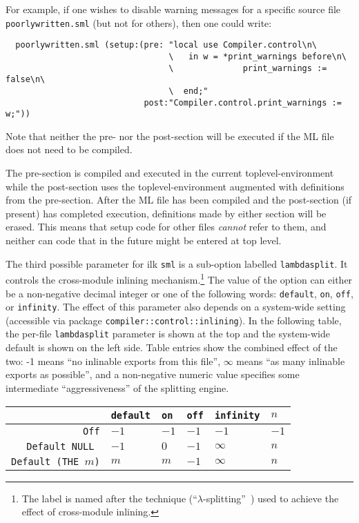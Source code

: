 For example, if one wishes to disable warning messages for a specific
source file {\tt poorlywritten.sml} (but not for others), then one
could write:

\begin{verbatim}
  poorlywritten.sml (setup:(pre: "local use Compiler.control\n\
                                 \   in w = *print_warnings before\n\
                                 \              print_warnings := false\n\
                                 \  end;"
                            post:"Compiler.control.print_warnings := w;"))
\end{verbatim}

\noindent Note that neither the pre- nor the post-section will be
executed if the ML file does not need to be compiled.

The pre-section is compiled and executed in the current
toplevel-environment while the post-section uses the
toplevel-environment augmented with definitions from the pre-section.
After the ML file has been compiled and the post-section (if present)
has completed execution, definitions made by either section will be
erased.  This means that setup code for other files {\em cannot} refer
to them, and neither can code that in the future might be entered at
top level.

The third possible parameter for ilk {\tt sml} is a
sub-option labelled {\tt lambdasplit}.  It controls the cross-module
inlining mechanism.\footnote{The label is named after the
technique (``$\lambda$-splitting''~\cite{blume97:lsplit}) used to
achieve the effect of cross-module inlining.}  The value of the option
can either be a non-negative decimal integer or one of the following
words: {\tt default}, {\tt on}, {\tt off}, or {\tt infinity}.  The
effect of this parameter also depends on a system-wide setting
(accessible via package {\tt compiler::control::inlining}).
In the following table, the per-file {\tt lambdasplit} parameter is
shown at the top and the system-wide default is shown on the left
side.  Table entries show the combined effect of the two: -1
means ``no inlinable exports from this file'', $\infty$ means
``as many inlinable exports as possible'', and a non-negative numeric
value specifies some intermediate ``aggressiveness'' of the splitting
engine.

\begin{center}
\begin{tabular}{r||l|l|l|l|l}
             & {\tt default} & {\tt on} & {\tt off} & {\tt infinity} & $n$ \\
\hline \hline
{\tt Off}    & $-1$          & $-1$     & $-1$      & $-1$           & $-1$ \\
\hline
{\tt Default NULL } & $-1$   & $0$      & $-1$      & $\infty$       & $n$ \\
\hline
{\tt Default (THE $m$)} & $m$ & $m$    & $-1$      & $\infty$       & $n$
\end{tabular}
\end{center}

